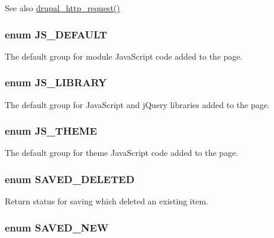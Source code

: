 \begin{DoxySeeAlso}{See also}
\hyperlink{group__http__handling_gaad3affacd718b960300dcdddefa518aa}{drupal\_\-http\_\-request()} 
\end{DoxySeeAlso}
\hypertarget{common_8inc_ade8dfc1503d597ba5ea4af975b0d8811}{
\subsubsection[{JS\_\-DEFAULT}]{\setlength{\rightskip}{0pt plus 5cm}enum {\bf JS\_\-DEFAULT}}}
\label{common_8inc_ade8dfc1503d597ba5ea4af975b0d8811}
The default group for module JavaScript code added to the page. \hypertarget{common_8inc_a7efeab296e4345588b1279ec758e52b3}{
\subsubsection[{JS\_\-LIBRARY}]{\setlength{\rightskip}{0pt plus 5cm}enum {\bf JS\_\-LIBRARY}}}
\label{common_8inc_a7efeab296e4345588b1279ec758e52b3}
The default group for JavaScript and jQuery libraries added to the page. \hypertarget{common_8inc_a8d0998ffbec2cf7f8c2da3a80185fad2}{
\subsubsection[{JS\_\-THEME}]{\setlength{\rightskip}{0pt plus 5cm}enum {\bf JS\_\-THEME}}}
\label{common_8inc_a8d0998ffbec2cf7f8c2da3a80185fad2}
The default group for theme JavaScript code added to the page. \hypertarget{common_8inc_a38f401ae5a8d3c2f0a06307fa001fff5}{
\subsubsection[{SAVED\_\-DELETED}]{\setlength{\rightskip}{0pt plus 5cm}enum {\bf SAVED\_\-DELETED}}}
\label{common_8inc_a38f401ae5a8d3c2f0a06307fa001fff5}
Return status for saving which deleted an existing item. \hypertarget{common_8inc_a7d54df6ca81759341e08f451d4f6c8cd}{
\subsubsection[{SAVED\_\-NEW}]{\setlength{\rightskip}{0pt plus 5cm}enum {\bf SAVED\_\-NEW}}}

